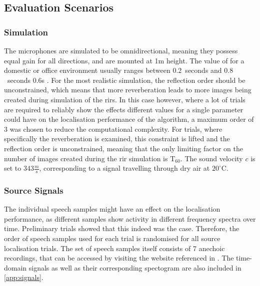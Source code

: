 \subsection{Evaluation Scenarios}
\subsubsection*{Simulation}
The microphones are simulated to be omnidirectional, meaning they possess equal gain for all directions, and are mounted at 1m height. The value of \Tsixty for a domestic or office environment usually ranges between $0.2$~seconds and $0.8$~seconds 0.6s \cite[p.~695]{Gannot2017}. For the most realistic simulation, the reflection order should be unconstrained, which means that more reverberation leads to more images being created during simulation of the \glspl{rir}. In this case however, where a lot of trials are required to reliably show the effects different values for a single parameter could have on the localisation performance of the algorithm, a maximum order of 3 was chosen to reduce the computational complexity. For trials, where specifically the reverberation is examined, this constraint is lifted and the reflection order is unconstrained, meaning that the only limiting factor on the number of images created during the \gls{rir} simulation is T$_{60}$. The sound velocity $c$ is set to $343\frac{m}{s}$, corresponding to a signal travelling through dry air at $20^{\circ}$C.


\subsubsection*{Source Signals}
\label{sec:evalSignals}
The individual speech samples might have an effect on the localisation performance, as different samples show activity in different frequency spectra over time. Preliminary trials showed that this indeed was the case. Therefore, the order of speech samples used for each trial is randomised for all source localisation trials. The set of speech samples itself consists of 7 anechoic recordings, that can be accessed by visiting the website referenced in \cite{Mainczyk2017}.  The time-domain signals as well as their corresponding spectogram are also included in \autoref{app:signals}.

